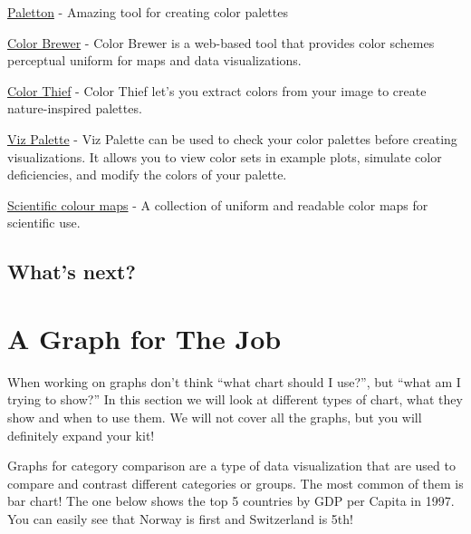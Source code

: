 \documentclass[
  letterpaper,
]{book}
\begin{document}
\href{https://paletton.com/}{Paletton} - Amazing tool for creating color
palettes

\href{http://colorbrewer2.org/}{Color Brewer} - Color Brewer is a
web-based tool that provides color schemes perceptual uniform for maps
and data visualizations.

\href{https://lokeshdhakar.com/projects/color-thief/}{Color Thief} -
Color Thief let's you extract colors from your image to create
nature-inspired palettes.

\href{https://projects.susielu.com/viz-palette}{Viz Palette} - Viz
Palette can be used to check your color palettes before creating
visualizations. It allows you to view color sets in example plots,
simulate color deficiencies, and modify the colors of your palette.

\href{https://www.fabiocrameri.ch/colourmaps/}{Scientific colour maps} -
A collection of uniform and readable color maps for scientific use.

\hypertarget{whats-next}{%
\section{What's next?}\label{whats-next}}

\hypertarget{a-graph-for-the-job}{%
\chapter{A Graph for The Job}\label{a-graph-for-the-job}}

When working on graphs don't think ``what chart should I use?'', but
``what am I trying to show?'' In this section we will look at different
types of chart, what they show and when to use them. We will not cover
all the graphs, but you will definitely expand your kit!

Graphs for category comparison are a type of data visualization that are
used to compare and contrast different categories or groups. The most
common of them is bar chart! The one below shows the top 5 countries by
GDP per Capita in 1997. You can easily see that Norway is first and
Switzerland is 5th!
\end{document}
